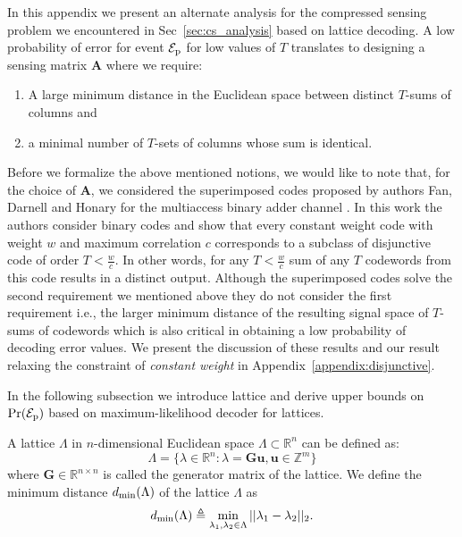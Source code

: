 In this appendix we present an alternate analysis for the compressed sensing problem we encountered in Sec~\ref{sec:cs_analysis} based on lattice decoding. A low probability of error for event $\mathcal{E}_{\mathrm{p}}$ for low values of $T$ translates to designing a sensing matrix $\mathbf{A}$ where we require: 
\begin{enumerate}
\item A large minimum distance in the Euclidean space between distinct $T$-sums of columns and 
\item a minimal number of $T$-sets of columns whose sum is identical.
\end{enumerate} 
Before we formalize the above mentioned notions, we would like to note that, for the choice of $\mathbf{A}$, we considered the superimposed codes proposed by authors Fan, Darnell and Honary for the multiaccess binary adder channel \cite{fan1995superimposed}. In this work the authors consider binary codes and show that every constant weight code with weight $w$ and maximum correlation $c$ corresponds to a subclass of disjunctive code of order $T<\frac{w}{c}$. In other words, for any $T<\frac{w}{c}$ sum of any $T$ codewords from this code results in a distinct output. Although the superimposed codes solve the second requirement we mentioned above they do not consider the first requirement i.e., the larger minimum distance of the resulting signal space of $T$-sums of codewords which is also critical in obtaining a low probability of decoding error values. We present the discussion of these results and our result relaxing the constraint of \textit{constant weight} in Appendix~\ref{appendix:disjunctive}.

In the following subsection we introduce lattice and derive upper bounds on $\mathrm{Pr}(\mathcal{E}_{\mathrm{p}})$ based on maximum-likelihood decoder for lattices.
\begin{definition}
A lattice $\Lambda$ in $n$-dimensional Euclidean space $\Lambda\subset \mathbb{R}^{n}$ can be defined as:
\begin{equation}
\Lambda =\{\lambda\in\mathbb{R}^{n}:\lambda=\mathbf{G}\mathbf{u},\mathbf{u}\in \mathbb{Z}^{m}\}
\end{equation}
where $\mathbf{G}\in\mathbb{R}^{n \times n}$ is called the generator matrix of the lattice. We define the minimum distance $d_{\mathrm{min}}(\Lambda)$ of the lattice $\Lambda$ as 
\[
d_{\mathrm{min}}(\Lambda)\triangleq \min_{\lambda_1, \lambda_2\in\Lambda } ||\lambda_1-\lambda_2||_2.
\]
\end{definition}

